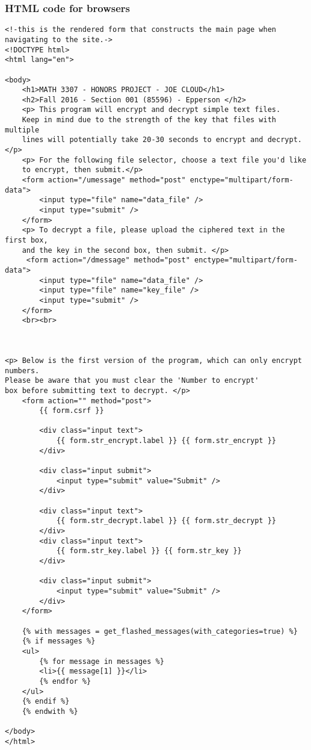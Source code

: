 \documentclass[a4paper]{article}
\begin{document}
\subsubsection{HTML code for browsers}
\begin{verbatim}
<!-this is the rendered form that constructs the main page when navigating to the site.->
<!DOCTYPE html>
<html lang="en">

<body>
    <h1>MATH 3307 - HONORS PROJECT - JOE CLOUD</h1>
    <h2>Fall 2016 - Section 001 (85596) - Epperson </h2>
    <p> This program will encrypt and decrypt simple text files. 
    Keep in mind due to the strength of the key that files with multiple 
    lines will potentially take 20-30 seconds to encrypt and decrypt.</p>
    <p> For the following file selector, choose a text file you'd like 
    to encrypt, then submit.</p>
    <form action="/umessage" method="post" enctype="multipart/form-data">
        <input type="file" name="data_file" />
        <input type="submit" />
    </form>
    <p> To decrypt a file, please upload the ciphered text in the first box, 
    and the key in the second box, then submit. </p>  
     <form action="/dmessage" method="post" enctype="multipart/form-data">
        <input type="file" name="data_file" />
        <input type="file" name="key_file" />
        <input type="submit" />
    </form>
    <br><br>



<p> Below is the first version of the program, which can only encrypt numbers. 
Please be aware that you must clear the 'Number to encrypt' 
box before submitting text to decrypt. </p>  
    <form action="" method="post">
        {{ form.csrf }}

        <div class="input text">
            {{ form.str_encrypt.label }} {{ form.str_encrypt }}
        </div>

        <div class="input submit">
            <input type="submit" value="Submit" />
        </div>

        <div class="input text">
            {{ form.str_decrypt.label }} {{ form.str_decrypt }}
        </div>
        <div class="input text">
            {{ form.str_key.label }} {{ form.str_key }}
        </div>

        <div class="input submit">
            <input type="submit" value="Submit" />
        </div>
    </form>

    {% with messages = get_flashed_messages(with_categories=true) %}
    {% if messages %}
    <ul>
        {% for message in messages %}
        <li>{{ message[1] }}</li>
        {% endfor %}
    </ul>
    {% endif %}
    {% endwith %}

</body>
</html>
\end{verbatim}
\end{document}
